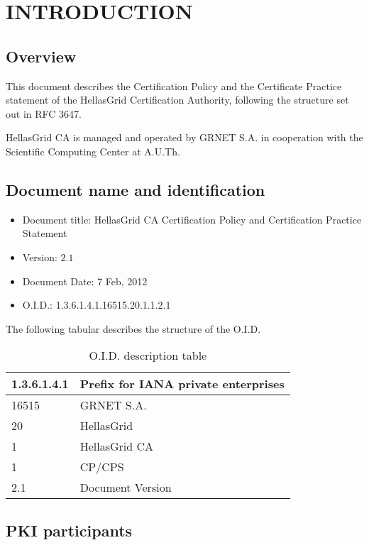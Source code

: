 
\chapter{INTRODUCTION}
\section{Overview}

This document describes the Certification Policy and the Certificate Practice statement of the HellasGrid Certification Authority, following the structure set out in RFC 3647. 

HellasGrid CA is managed and operated by GRNET S.A. in cooperation with the Scientific Computing Center at A.U.Th.

\section{Document name and identification}
\label{sec:DocumentNameAndIdentification}

\begin{itemize}
\item{Document title: HellasGrid CA Certification Policy and Certification Practice Statement}
\item{Version: $2.1$}
\item{Document Date: 7 Feb, 2012}
\item{O.I.D.: 1.3.6.1.4.1.16515.20.1.1.2.1}
\end{itemize}
The following tabular describes the structure of the O.I.D.

\begin{table}[hbt]
\begin{center}
\begin{tabular}{|l|l|}
\hline
1.3.6.1.4.1 & Prefix for IANA private enterprises \\
\hline
16515 & GRNET S.A. \\
\hline
20 & HellasGrid \\
\hline
1 & HellasGrid CA \\
\hline
1 & CP/CPS \\
\hline
2.1 & Document Version \\
\hline
\end{tabular}
\end{center}
\caption{O.I.D. description table}
\end{table}

\section{PKI participants}

